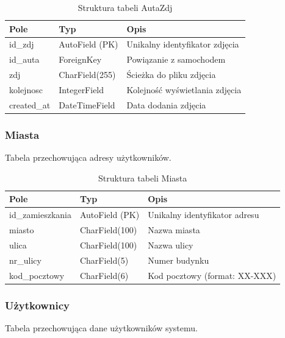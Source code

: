 \documentclass[12pt,a4paper]{article}
\begin{document}
\begin{table}[H]
\centering
\begin{tabular}{|l|l|p{7cm}|}
\hline
\textbf{Pole} & \textbf{Typ} & \textbf{Opis} \\
\hline
id\_zdj & AutoField (PK) & Unikalny identyfikator zdjęcia \\
\hline
id\_auta & ForeignKey & Powiązanie z samochodem \\
\hline
zdj & CharField(255) & Ścieżka do pliku zdjęcia \\
\hline
kolejnosc & IntegerField & Kolejność wyświetlania zdjęcia \\
\hline
created\_at & DateTimeField & Data dodania zdjęcia \\
\hline
\end{tabular}
\caption{Struktura tabeli AutaZdj}
\end{table}

\subsubsection{Miasta}
Tabela przechowująca adresy użytkowników.

\begin{table}[H]
\centering
\begin{tabular}{|l|l|p{7cm}|}
\hline
\textbf{Pole} & \textbf{Typ} & \textbf{Opis} \\
\hline
id\_zamieszkania & AutoField (PK) & Unikalny identyfikator adresu \\
\hline
miasto & CharField(100) & Nazwa miasta \\
\hline
ulica & CharField(100) & Nazwa ulicy \\
\hline
nr\_ulicy & CharField(5) & Numer budynku \\
\hline
kod\_pocztowy & CharField(6) & Kod pocztowy (format: XX-XXX) \\
\hline
\end{tabular}
\caption{Struktura tabeli Miasta}
\end{table}

\newpage

\subsubsection{Użytkownicy}
Tabela przechowująca dane użytkowników systemu.
\end{document}
